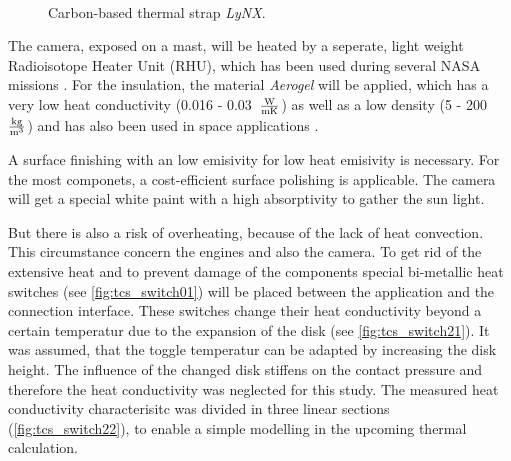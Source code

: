 \begin{figure}[h]
	\centering
	\qquad\qquad
	\caption{Carbon-based thermal strap \textit{LyNX}\textsuperscript{\tiny\textregistered}.}
	\label{fig:tcs_strap01}
\end{figure}


The camera, exposed on a mast, will be heated by a seperate, light weight Radioisotope Heater Unit (RHU), which has  been used during several NASA missions \cite{ref_tcs_02}.
For the insulation, the material \textit{Aerogel} will be applied, which has a very low heat conductivity (0.016 - 0.03\ $\frac{{\rm W}}{{\rm m} {\rm K}} $) as well as a low density (5 - 200\ $\frac{{\rm kg}}{{\rm m}^3}$) and has also been used in space applications \cite{ref_tcs_03}.

A surface finishing with an low emisivity for low heat emisivity is necessary.
For the most componets, a cost-efficient surface polishing is applicable.
The camera will get a special white paint with a high absorptivity to gather the  sun light.

But there is also a risk of overheating, because of the lack of heat convection.
This circumstance concern the engines and also the camera.
To get rid of the extensive heat and to prevent damage of the components special bi-metallic heat switches (see \autoref{fig:tcs_switch01}) will be  placed between the application and the connection interface.
These switches change their heat conductivity beyond a certain temperatur due to the expansion of the disk (see \autoref{fig:tcs_switch21}).
It was assumed, that the toggle temperatur can be adapted by increasing the disk height.
The influence of the changed disk stiffens on the contact pressure and therefore the heat conductivity was neglected for this study.
The measured heat conductivity characterisitc was divided in three linear sections (\autoref{fig:tcs_switch22}), to enable a simple modelling in the upcoming thermal calculation.

